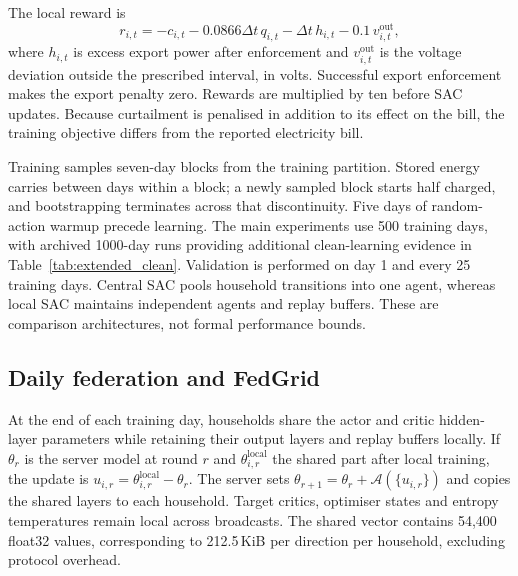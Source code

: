\documentclass[preprint,12pt,a4paper]{elsarticle}
\begin{document}
The local reward is
\begin{equation}
r_{i,t}=-c_{i,t}-0.0866\Delta t\,q_{i,t}
-\Delta t\,h_{i,t}-0.1\,v^{\mathrm{out}}_{i,t},
\end{equation}
where $h_{i,t}$ is excess export power after enforcement and $v^{\mathrm{out}}_{i,t}$ is the voltage deviation outside the prescribed interval, in volts. Successful export enforcement makes the export penalty zero. Rewards are multiplied by ten before SAC updates. Because curtailment is penalised in addition to its effect on the bill, the training objective differs from the reported electricity bill.

Training samples seven-day blocks from the training partition. Stored energy carries between days within a block; a newly sampled block starts half charged, and bootstrapping terminates across that discontinuity. Five days of random-action warmup precede learning. The main experiments use 500 training days, with archived 1000-day runs providing additional clean-learning evidence in Table~\ref{tab:extended_clean}. Validation is performed on day 1 and every 25 training days. Central SAC pools household transitions into one agent, whereas local SAC maintains independent agents and replay buffers. These are comparison architectures, not formal performance bounds.

\subsection{Daily federation and FedGrid}
At the end of each training day, households share the actor and critic hidden-layer parameters while retaining their output layers and replay buffers locally. If $\theta_r$ is the server model at round $r$ and $\theta_{i,r}^{\mathrm{local}}$ the shared part after local training, the update is $u_{i,r}=\theta_{i,r}^{\mathrm{local}}-\theta_r$. The server sets $\theta_{r+1}=\theta_r+\mathcal A(\{u_{i,r}\})$ and copies the shared layers to each household. Target critics, optimiser states and entropy temperatures remain local across broadcasts. The shared vector contains 54,400 float32 values, corresponding to 212.5\,KiB per direction per household, excluding protocol overhead.
\end{document}
